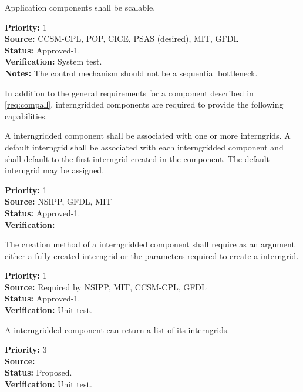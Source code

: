 Application components shall be scalable.

\begin{reqlist}
{\bf Priority:} 1 \\ 
{\bf Source:}  CCSM-CPL, POP, CICE, PSAS (desired), MIT, GFDL \\
{\bf Status:} Approved-1. \\
{\bf Verification:} System test.\\ 
{\bf Notes:}  The control mechanism should not be a sequential bottleneck.
\end{reqlist}


In addition to the general requirements for  a component described in 
\ref{req:compall}, interngridded components are required to provide the
following capabilities.

A interngridded component shall be associated with one or more interngrids.
A default interngrid shall be associated with 
each interngridded component and shall default to the first interngrid created 
in the component.  The default interngrid may be assigned.
\begin{reqlist}
{\bf Priority:} 1\\
{\bf Source:} NSIPP, GFDL, MIT \\
{\bf Status:} Approved-1.\\
{\bf Verification:} 
\end{reqlist}

The creation method of a interngridded component shall require as an 
argument either a fully created interngrid or the parameters
required to create a interngrid.
\begin{reqlist}
{\bf Priority:} 1\\
{\bf Source:} Required by NSIPP, MIT, CCSM-CPL, GFDL \\
{\bf Status:} Approved-1. \\
{\bf Verification:} Unit test.
\end{reqlist}


A interngridded component can return a list of its interngrids.
\begin{reqlist}
{\bf Priority:} 3\\
{\bf Source:} \\
{\bf Status:} Proposed. \\
{\bf Verification:} Unit test.
\end{reqlist}

